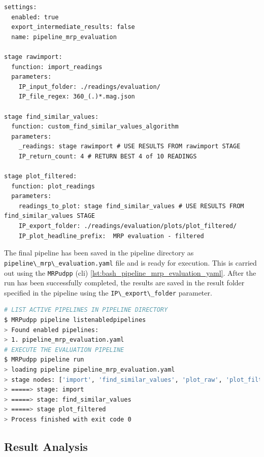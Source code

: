 \begin{lstlisting}[caption={User defined processing pipeline using custom implemented filter algorithm}, label=lst:pipeline_mrp_evaluation_yaml]
settings:
  enabled: true
  export_intermediate_results: false
  name: pipeline_mrp_evaluation

stage rawimport:
  function: import_readings
  parameters:
    IP_input_folder: ./readings/evaluation/
    IP_file_regex: 360_(.)*.mag.json

stage find_similar_values:
  function: custom_find_similar_values_algorithm
  parameters:
    _readings: stage rawimport # USE RESULTS FROM rawimport STAGE
    IP_return_count: 4 # RETURN BEST 4 of 10 READINGS

stage plot_filtered:
  function: plot_readings
  parameters:
    readings_to_plot: stage find_similar_values # USE RESULTS FROM find_similar_values STAGE
    IP_export_folder: ./readings/evaluation/plots/plot_filtered/
    IP_plot_headline_prefix:  MRP evaluation - filtered
\end{lstlisting}

The final pipeline has been saved in the pipeline directory as
\passthrough{\lstinline!pipeline\_mrp\_evaluation.yaml!} file and is
ready for execution. This is carried out using the
\passthrough{\lstinline!MRPudpp!} (cli)
\ref{lst:bash_pipeline_mrp_evaluation_yaml}. After the run has been
successfully completed, the results are saved in the result folder
specified in the pipeline using the
\passthrough{\lstinline!IP\_export\_folder!} parameter.

\begin{lstlisting}[language=bash, caption={Bash result log of evaluation pipeline run}, label=lst:bash_pipeline_mrp_evaluation_yaml]
# LIST ACTIVE PIPELINES IN PIPELINE DIRECTORY 
$ MRPudpp pipeline listenabledpipelines
> Found enabled pipelines:
> 1. pipeline_mrp_evaluation.yaml
# EXECUTE THE EVALUATION PIPELINE
$ MRPudpp pipeline run
> loading pipeline pipeline_mrp_evaluation.yaml
> stage nodes: ['import', 'find_similar_values', 'plot_raw', 'plot_filtered']
> =====> stage: import 
> =====> stage: find_similar_values 
> =====> stage plot_filtered 
> Process finished with exit code 0
\end{lstlisting}

\hypertarget{result-analysis-1}{%
\subsection{Result Analysis}\label{result-analysis-1}}

